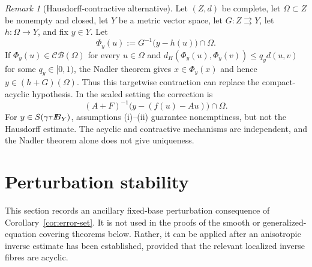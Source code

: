 \documentclass[11pt]{amsart}
\theoremstyle{definition}
\theoremstyle{remark}
\newtheorem{remark}[theorem]{Remark}
\newcommand{\tto}{\rightrightarrows}
\newcommand{\CB}{\mathcal{CB}}
\def\ball{{I\kern -.35em B}}
\begin{document}
	\begin{remark}[Hausdorff-contractive alternative]
		\label{rem:nadler-alternative}
		Let $(Z,d)$ be complete, let $\Omega\subset Z$ be nonempty and closed,
		let $Y$ be a metric vector space, let $G:Z\tto Y$, let
		$h:\Omega\longrightarrow Y$, and fix $y\in Y$.  Let
		$$
		\Phi_y(u):=G^{-1}\bigl(y-h(u)\bigr)\cap\Omega .
		$$
		If $\Phi_y(u)\in\CB(\Omega)$ for every $u\in\Omega$ and
		$d_H(\Phi_y(u),\Phi_y(v))\le q_y d(u,v)$ for some
		$q_y\in[0,1)$, the Nadler theorem \cite{Nadler} gives $x\in\Phi_y(x)$ and hence
		$y\in(h+G)(\Omega)$.  Thus this targetwise contraction can replace the
		compact-acyclic hypothesis.  In the scaled setting the correction is
		$$
		(A+F)^{-1}\bigl(y-(f(u)-Au)\bigr)\cap\Omega .
		$$
		For $y\in S(\gamma\tau\ball_Y)$, assumptions {\rm (i)}--{\rm (ii)}
		guarantee nonemptiness, but not the Hausdorff estimate.  The acyclic and
		contractive mechanisms are independent, and the Nadler theorem alone does
		not give uniqueness.
	\end{remark}
	\section{Perturbation stability}
	\label{sec:perturbation}
	
	This section records an ancillary fixed-base perturbation consequence of
	Corollary~\ref{cor:error-set}. It is not used in the proofs of the smooth or
	generalized-equation covering theorems below. Rather, it can be applied after
	an anisotropic inverse estimate has been established, provided that the
	relevant localized inverse fibres are acyclic.
	
\end{document}

